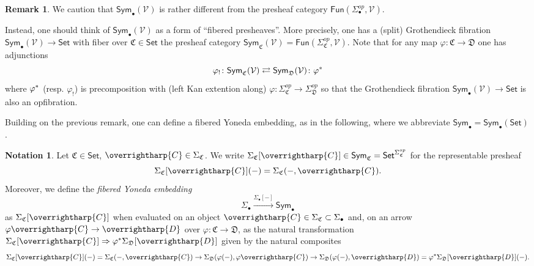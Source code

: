 \documentclass[a4paper,10pt
,draft
]{article}%
\numberwithin{equation}{section}
\numberwithin{figure}{section}
\theoremstyle{definition} %
\newtheorem{remark}[equation]{Remark}%
\newtheorem{notation}[equation]{Notation}%
\newcommand{\vect}[1]{\text{\overrightharp{\ensuremath{#1}}}}
\newcommand{\Sym}{\ensuremath{\mathsf{Sym}}}%
\newcommand{\V}{\ensuremath{\mathcal V}}
\newcommand{\1}{\ensuremath{\mathbbm 1}}%
\begin{document}
\begin{remark}
We caution that 
$\mathsf{Sym}_{\bullet}(\V)$
is rather different from the presheaf category 
$\mathsf{Fun}(\Sigma_{\bullet}^{op},\V)$.

Instead, one should think of 
$\mathsf{Sym}_{\bullet}(\V)$
as a form of ``fibered presheaves''.
More precisely, 
one has a (split) Grothendieck fibration
$\mathsf{Sym}_{\bullet}(\V) \to \mathsf{Set}$
with fiber over 
$\mathfrak{C} \in \mathsf{Set}$
the presheaf category
$\Sym_{\mathfrak C}(\V)=
\mathsf{Fun}(\Sigma_{\mathfrak{C}}^{op},\mathcal{V})$.
Note that for any map
$\varphi \colon \mathfrak{C} \to \mathfrak{D}$
one has adjunctions
\begin{equation}\label{COLCHADJ EQ}
\varphi_! \colon \Sym_{\mathfrak C}(\V) 
\rightleftarrows 
\Sym_{\mathfrak D}(\V) \colon \varphi^{\**}
\end{equation}
where $\varphi^{\**}$
(resp. $\varphi_!$)
is precomposition with (left Kan extention along)
$\varphi\colon 
\Sigma^{op}_{\mathfrak{C}}
\to 
\Sigma^{op}_{\mathfrak{D}}
$
so that the Grothendieck fibration
$\mathsf{Sym}_{\bullet}(\V) \to \mathsf{Set}$
is also an opfibration. 
\end{remark}

Building on the previous remark,
one can define a fibered Yoneda embedding, as in the following,
where we abbreviate
$\mathsf{Sym}_{\bullet} = \mathsf{Sym}_{\bullet}(\mathsf{Set})$.

\begin{notation}\label{FIBYON NOT}
Let $\mathfrak{C} \in \mathsf{Set}$, $\vect{C} \in \Sigma_{\mathfrak{C}}$.
We write
$\Sigma_{\mathfrak{C}}[\vect{C}] 
\in \mathsf{Sym}_{\mathfrak{C}} = \mathsf{Set}^{\Sigma_{\mathfrak{C}}^{op}}$ for the representable presheaf
\[\Sigma_{\mathfrak{C}}[\vect{C}](-)
= \Sigma_{\mathfrak{C}}(-,\vect{C}).\]
Moreover, we define the \emph{fibered Yoneda embedding}
\begin{equation}\label{FIBYON EQ}
\Sigma_{\bullet} \xrightarrow{\Sigma_{\bullet}[-]} \mathsf{Sym}_{\bullet}
\end{equation}
as $\Sigma_{\mathfrak{C}}[\vect{C}]$
when evaluated on an object
$\vect{C} \in \Sigma_{\mathfrak{C}} \subset \Sigma_{\bullet}$
and, on an arrow 
$\varphi \vect{C} \to \vect{D}$
over $\varphi \colon \mathfrak{C} \to \mathfrak{D}$,
as the natural transformation
$\Sigma_{\mathfrak{C}}[\vect{C}]
\Rightarrow
\varphi^{\**}
\Sigma_{\mathfrak{D}}[\vect{D}]
$ given by the natural composites
\[\Sigma_{\mathfrak{C}}[\vect{C}](-)
= \Sigma_{\mathfrak{C}}(-,\vect{C})
\to 
\Sigma_{\mathfrak{D}}(\varphi(-),\varphi\vect{C})
\to
\Sigma_{\mathfrak{D}}(\varphi(-),\vect{D})
=
\varphi^{\**} \Sigma_{\mathfrak{D}}[\vect{D}](-).
\]
\end{notation}
\end{document}
